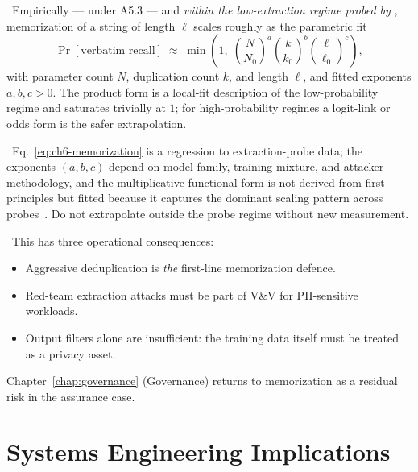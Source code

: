 \Emp\ Empirically — under A5.3 — and \emph{within the
low-extraction regime probed by} \citet{carlini2023quantifying},
memorization of a string of length $\ell$ scales roughly as the
parametric fit
\begin{equation}
\label{eq:ch6-memorization}
\Pr[\text{verbatim recall}]
  \;\approx\; \min\!\left(1,\;
              \left(\frac{N}{N_0}\right)^{a}
              \left(\frac{k}{k_0}\right)^{b}
              \left(\frac{\ell}{\ell_0}\right)^{c}\right),
\end{equation}
with parameter count $N$, duplication count $k$, and length $\ell$,
and fitted exponents $a, b, c > 0$. The product form is a
local-fit description of the low-probability regime and saturates
trivially at $1$; for high-probability regimes a logit-link or odds
form is the safer extrapolation.

\Assum\ Eq.~\eqref{eq:ch6-memorization} is a regression to
extraction-probe data; the exponents $(a, b, c)$ depend on model
family, training mixture, and attacker methodology, and the
multiplicative functional form is not derived from first principles
but fitted because it captures the dominant scaling pattern across
probes~\citep{carlini2023quantifying}. Do not extrapolate outside the
probe regime without new measurement.

\Cons\ This has three operational consequences:
\begin{itemize}
  \item Aggressive deduplication is \emph{the} first-line memorization
        defence.
  \item Red-team extraction attacks must be part of V\&V for
        PII-sensitive workloads.
  \item Output filters alone are insufficient: the training data
        itself must be treated as a privacy asset.
\end{itemize}
Chapter~\ref{chap:governance} (Governance) returns to memorization as a residual risk in
the assurance case.

\section{Systems Engineering Implications}

